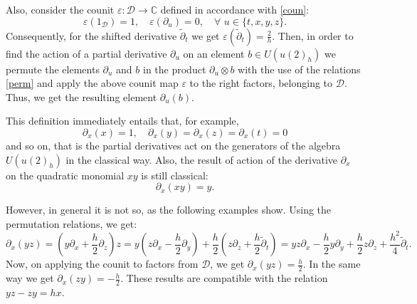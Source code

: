 \documentclass[11pt]{article}
\newcommand{\pa}{\partial}
\newcommand{\ot}{\otimes}
\newcommand{\C}{\mathbb{C}}
\newcommand{\DD}{\mathcal{D}}
\newcommand{\tpa}{\widetilde{\pa}}
\numberwithin{equation}{section}
\theoremstyle{plain}
\theoremstyle{definition}
\begin{document}
Also, consider the counit $\varepsilon:\DD\to \C$ defined in accordance with \eqref{coun}:
\begin{equation}
\varepsilon(1_{\DD})=1, \quad \varepsilon(\pa_u)=0,\quad \forall\,\, u\in \{t,x,y,z\}.
\label{counn}
\end{equation}
Consequently, for the shifted derivative $\tilde\partial_t$ we get $\varepsilon(\tpa_t)=\frac{2}{h}$.
Then, in order to find the action of a partial derivative $\pa_u$ on an element $b\in  U(u(2)_h)$ we permute the elements
$\pa_u$ and $b$ in the product
$\pa_u\ot b$ with the use of the relations \eqref{perm} and apply the above counit map $\varepsilon$ to the right factors,
belonging to $\DD$. Thus, we get the resulting
element $\pa_u(b)$.

This definition immediately entails that, for example,
\[
\pa_x(x)=1, \quad \pa_x(y)= \pa_x(z)=\pa_x(t) = 0
\]
and so on, that is the partial derivatives act on the generators of the algebra $U(u(2)_h)$ in the classical way.
Also, the result of action of the derivative $\pa_x$ on the quadratic monomial $xy$ is still classical:
\[ \pa_x(xy)= y.\]

However, in general it is not so, as the following examples show. Using the permutation relations, we get:
\[
\pa_x (yz)=(y\pa_x+\frac{h}{2}\pa_z)z=y(z\pa_x-\frac{h}{2}\pa_y)+\frac{h}{2}(z\pa_z+\frac{h}{2}\tpa_t)=
yz\pa_x-\frac{h}{2}y\pa_y+\frac{h}{2}z\pa_z+\frac{h^2}{4}\tpa_t.
\]
Now, on applying the counit to factors from $\DD$, we get $\pa_x (yz)=\frac{h}{2}$.
In the same way we get $\pa_x (zy)=-\frac{h}{2}$. These results are compatible with the relation  $yz-zy=hx$.
\end{document}
